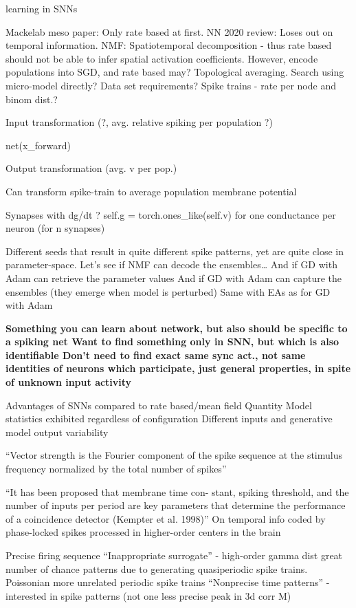 \documentclass[mphil,deptreport,ai]{infthesis} %
\begin{document}
\cite{Taherkhani2020} learning in SNNs

Mackelab meso paper: Only rate based at first.
NN 2020 review: Loses out on temporal information.
NMF: Spatiotemporal decomposition - thus rate based should not be able to infer spatial activation coefficients. However, encode populations into SGD, and rate based may? 
Topological averaging.
Search using micro-model directly? Data set requirements? Spike trains - rate per node and binom dist.?




Input transformation (?, avg. relative spiking per population ?)

net(x\_forward)

Output transformation (avg. v per pop.)

Can transform spike-train to average population membrane potential

Synapses with dg/dt ?
self.g = torch.ones\_like(self.v)  for one conductance per neuron (for n synapses)

Different seeds that result in quite different spike patterns, yet are quite close in parameter-space.
Let’s see if NMF can decode the ensembles…
And if GD with Adam can retrieve the parameter values
And if GD with Adam can capture the ensembles (they emerge when model is perturbed)
Same with EAs as for GD with Adam

\textbf{Something you can learn about network, but also should be specific to a spiking net
Want to find something only in SNN, but which is also identifiable
Don’t need to find exact same sync act., not same identities of neurons which participate, just general properties, in spite of unknown input activity}

Advantages of SNNs compared to rate based/mean field
Quantity
Model statistics exhibited regardless of configuration
Different inputs and generative model output variability

 “Vector strength is the Fourier component of the spike sequence at the stimulus frequency normalized by the total number of spikes”

“It has been proposed that membrane time con- stant, spiking threshold, and the number of inputs per period are key parameters that determine the performance of a coincidence detector (Kempter et al. 1998)”
On temporal info coded by phase-locked spikes processed in higher-order centers in the brain

Precise firing sequence
“Inappropriate surrogate” - high-order gamma dist great number of chance patterns due to generating quasiperiodic spike trains. Poissonian more unrelated periodic spike trains
“Nonprecise time patterns” - interested in spike patterns (not one less precise peak in 3d corr M)
\end{document}
